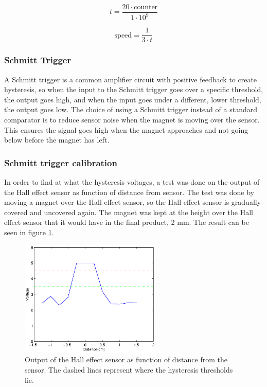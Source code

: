 \begin{equation} \label{eq:calc_time}
 t = \frac{20\cdot \text{counter}}{1\cdot 10^9}
\end{equation}

\begin{equation} \label{eq:calc_speed}
 \text{speed} = \frac{1}{3\cdot t}
\end{equation}

\subsubsection{Schmitt Trigger}
A Schmitt trigger is a common amplifier circuit with positive feedback to create hysteresis, so when the input to the Schmitt trigger goes over a specific threshold, the output goes high, and when the input goes under a different, lower threshold, the output goes low.
The choice of using a Schmitt trigger instead of a standard comparator is to reduce sensor noise when the magnet is moving over the sensor.
This ensures the signal goes high when the magnet approaches and not going below before the magnet has left.

\subsubsection{Schmitt trigger calibration} \label{sec:schmitt_cal}
In order to find at what the hysteresis voltages, a test was done on the output of the Hall effect sensor as function of distance from sensor.
The test was done by moving a magnet over the Hall effect sensor, so the Hall effect sensor is gradually covered and uncovered again. The magnet was kept at the height over the Hall effect sensor that it would have in the final product, 2 mm. 
The result can be seen in figure \ref{fig:hall_out}.

\begin{figure}[h]
 \centering
 \includegraphics[width=0.6\textwidth]{img/hall_out}
 \caption{Output of the Hall effect sensor as function of distance from the sensor. The dashed lines represent where the hysteresis thresholds lie.}
 \label{fig:hall_out}
\end{figure}

